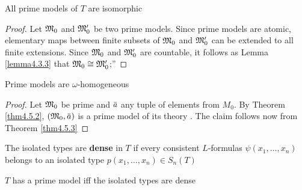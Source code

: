 \documentclass[11pt]{article}
\begin{document}
\begin{theorem}[]
\label{thm4.5.3}
All prime models of \(T\) are isomorphic
\end{theorem}

\begin{proof}
Let \(\mathfrak{M}_0\) and \(\mathfrak{M}_0'\) be two prime models. Since prime models are atomic, elementary maps
between finite subsets of \(\mathfrak{M}_0\) and \(\mathfrak{M}_0'\) can be extended to all finite extensions.
Since \(\mathfrak{M}_0\) and \(\mathfrak{M}_0'\) are countable, it follows as Lemma \ref{lemma4.3.3} that \(\mathfrak{M}_0\cong\mathfrak{M}_0'\);''
\end{proof}

\begin{corollary}[]
Prime models are \(\omega\)-homogeneous
\end{corollary}

\begin{proof}
Let \(\mathfrak{M}_0\) be prime and \(\bara\) any tuple of elements from \(M_0\). By Theorem
\ref{thm4.5.2}, \((\fM_0,\bara)\) is a prime model of its theory
. The claim follows now from Theorem \ref{thm4.5.3}
\end{proof}


\begin{definition}[]
The isolated types are \textbf{dense} in \(T\) if every consistent \(L\)-formulas \(\psi(x_1,\dots,x_n)\) belongs
to an isolated type \(p(x_1,\dots,x_n)\in S_n(T)\)
\end{definition}

\begin{theorem}[]
\label{thm4.5.7}
\(T\) has a prime model iff the isolated types are dense
\end{theorem}
\end{document}
